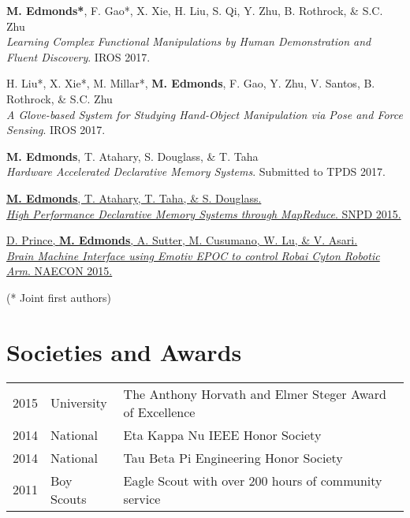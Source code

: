 \documentclass[letterpaper]{deedy-resume} %
\begin{document}
\begin{minipage}[t]{0.66\textwidth}
\textbf{M. Edmonds*}, F. Gao*, X. Xie, H. Liu, S. Qi, Y. Zhu, B. Rothrock, \& S.C. Zhu\\
\textit{Learning Complex Functional Manipulations by Human Demonstration and Fluent Discovery}. IROS 2017.

\vspace{5pt}

H. Liu*, X. Xie*, M. Millar*, \textbf{M. Edmonds}, F. Gao, Y. Zhu, V. Santos, B. Rothrock, \& S.C. Zhu \\
\textit{A Glove-based System for Studying Hand-Object Manipulation via Pose and Force Sensing}. IROS 2017.

\vspace{5pt}

\textbf{M. Edmonds}, T. Atahary, S. Douglass, \& T. Taha\\
\textit{Hardware Accelerated Declarative Memory Systems}. Submitted to TPDS 2017.

\vspace{5pt}

\href{http://ieeexplore.ieee.org/xpl/articleDetails.jsp?arnumber=7176183}
{\textbf{M. Edmonds}, T. Atahary, T. Taha, \& S. Douglass. \\
\textit{High Performance Declarative Memory Systems through MapReduce}. SNPD 2015.}

\vspace{5pt}

\href{http://ecommons.udayton.edu/cgi/viewcontent.cgi?article=1388&context=ece_fac_pub}
{D. Prince, \textbf{M. Edmonds}, A. Sutter, M. Cusumano, W. Lu, \& V. Asari.\\
\textit{Brain Machine Interface using Emotiv EPOC to control Robai Cyton Robotic Arm}. NAECON 2015.}


\hfill {\footnotesize (* Joint first authors)}

\sectionspace %


\section{Societies and Awards} 

\begin{tabular}{rll}
2015 & University & The Anthony Horvath and Elmer Steger Award of Excellence \\
2014 & National & Eta Kappa Nu IEEE Honor Society\\
2014 & National & Tau Beta Pi Engineering Honor Society\\
2011 & Boy Scouts & Eagle Scout with over 200 hours of community service\\
\end{tabular}

\sectionspace %


\end{minipage} %
\end{document}
